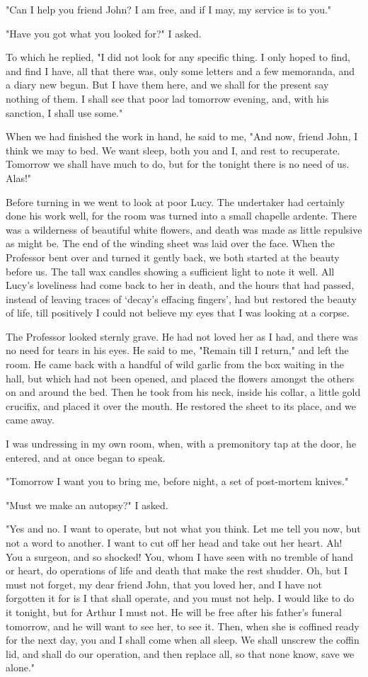 "Can I help you friend John? I am free, and if I may, my service is to you." 

"Have you got what you looked for?" I asked. 

To which he replied, "I did not look for any specific thing. I only hoped to find, and find I have, all that there was, only some letters and a few memoranda, and a diary new begun. But I have them here, and we shall for the present say nothing of them. I shall see that poor lad tomorrow evening, and, with his sanction, I shall use some." 

When we had finished the work in hand, he said to me, "And now, friend John, I think we may to bed. We want sleep, both you and I, and rest to recuperate. Tomorrow we shall have much to do, but for the tonight there is no need of us. Alas!" 

Before turning in we went to look at poor Lucy. The undertaker had certainly done his work well, for the room was turned into a small chapelle ardente. There was a wilderness of beautiful white flowers, and death was made as little repulsive as might be. The end of the winding sheet was laid over the face. When the Professor bent over and turned it gently back, we both started at the beauty before us. The tall wax candles showing a sufficient light to note it well. All Lucy's loveliness had come back to her in death, and the hours that had passed, instead of leaving traces of `decay's effacing fingers', had but restored the beauty of life, till positively I could not believe my eyes that I was looking at a corpse. 

The Professor looked sternly grave. He had not loved her as I had, and there was no need for tears in his eyes. He said to me, "Remain till I return," and left the room. He came back with a handful of wild garlic from the box waiting in the hall, but which had not been opened, and placed the flowers amongst the others on and around the bed. Then he took from his neck, inside his collar, a little gold crucifix, and placed it over the mouth. He restored the sheet to its place, and we came away. 

I was undressing in my own room, when, with a premonitory tap at the door, he entered, and at once began to speak. 

"Tomorrow I want you to bring me, before night, a set of post-mortem knives." 

"Must we make an autopsy?" I asked. 

"Yes and no. I want to operate, but not what you think. Let me tell you now, but not a word to another. I want to cut off her head and take out her heart. Ah! You a surgeon, and so shocked! You, whom I have seen with no tremble of hand or heart, do operations of life and death that make the rest shudder. Oh, but I must not forget, my dear friend John, that you loved her, and I have not forgotten it for is I that shall operate, and you must not help. I would like to do it tonight, but for Arthur I must not. He will be free after his father's funeral tomorrow, and he will want to see her, to see it. Then, when she is coffined ready for the next day, you and I shall come when all sleep. We shall unscrew the coffin lid, and shall do our operation, and then replace all, so that none know, save we alone." 


